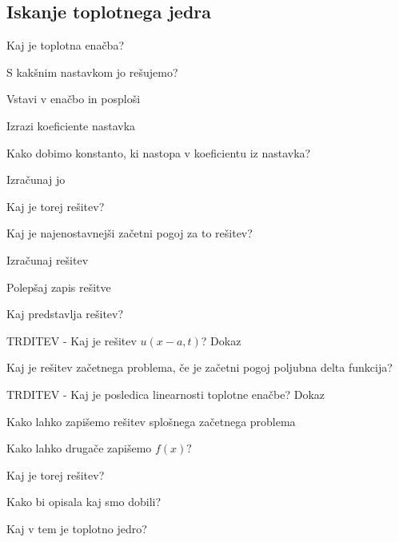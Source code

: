 \documentclass{article}
\begin{document}
    \subsection{Iskanje toplotnega jedra}
    \begin{enumerate}
        \item Kaj je toplotna enačba?
        {\color{red}\item S kakšnim nastavkom jo rešujemo?}
        \item Vstavi v enačbo in posploši
        \item Izrazi koeficiente nastavka
        \item Kako dobimo konstanto, ki nastopa v koeficientu iz nastavka?
        {\color{red}\item Izračunaj jo}
        \item Kaj je torej rešitev?
        \item Kaj je najenostavnejši začetni pogoj za to rešitev?
        \item Izračunaj rešitev
        {\color{red}\item Polepšaj zapis rešitve}
        {\color{red}\item Kaj predstavlja rešitev?}
        {\color{red}\item TRDITEV - Kaj je rešitev $u(x - a, t)$? Dokaz}
        \item Kaj je rešitev začetnega problema, če je začetni pogoj poljubna delta funkcija?
        {\color{red}\item TRDITEV - Kaj je posledica linearnosti toplotne enačbe? Dokaz} 
        \item Kako lahko zapišemo rešitev splošnega začetnega problema 
        {\color{red}\item Kako lahko drugače zapišemo $f(x)?$}
        {\color{red}\item Kaj je torej rešitev?}
        {\color{red}\item Kako bi opisala kaj smo dobili?}
        {\color{red}\item Kaj v tem je toplotno jedro?}
    \end{enumerate}
\end{document}
